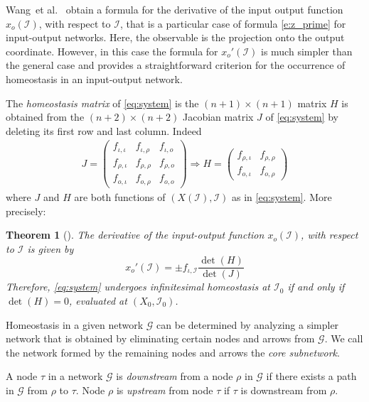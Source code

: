 \documentclass[a4paper,fleqn]{cas-dc}
\newcommand{\II}{{\mathcal I}}
\newtheorem{theorem}{Theorem}[section]
\newcommand{\etal}{\textrm{et al.}}
\begin{document}
Wang~\etal~\cite{wang2021} obtain a formula for the derivative of the input output function $x_o(\II)$, with respect to $\II$, that is a particular case of formula \eqref{e:z_prime} for input-output networks.
Here, the observable is the projection onto the output coordinate.
However, in this case the formula for 
$x_o'(\II)$ is much simpler than the general case and provides a straightforward criterion for the occurrence of homeostasis in an input-output network.

The \emph{homeostasis matrix} of \eqref{eq:system} is the $(n+1)\times (n+1)$ matrix $H$ is obtained from the $(n+2)\times(n+2)$ Jacobian matrix $J$ of \eqref{eq:system} by deleting its first row and last column. 
Indeed
\begin{align*}
J = \begin{pmatrix}
f_{\iota,\iota} & f_{\iota,\rho} & f_{\iota, o} \\
f_{\rho,\iota} & f_{\rho,\rho} & f_{\rho,o} \\
f_{o,\iota} & f_{o,\rho} & f_{o,o}
\end{pmatrix}
\Longrightarrow
H = \begin{pmatrix}
f_{\rho,\iota} & f_{\rho,\rho} \\
f_{o,\iota} & f_{o,\rho}
\end{pmatrix}
\end{align*}
where $J$ and $H$ are both functions of $(X(\II),\II)$ as in \eqref{eq:system}.  More precisely: 

\begin{theorem}[{\cite[lemma 1.5]{wang2021}}] \label{lem:irreducible}
The derivative of the input-output function $x_o(\II)$, with respect to $\II$ is given by
\begin{equation}
 x_o'(\II) = \pm f_{\iota,\II} \frac{\det(H)}{\det(J)} 
\end{equation}
Therefore, \eqref{eq:system} undergoes infinitesimal homeostasis at $\II_0$ if and only if $\det(H) = 0$, evaluated at $(X_0,\II_0)$. 
\end{theorem}

Homeostasis in a given network $\mathcal{G}$ can be determined by analyzing a simpler network that is obtained by eliminating certain nodes and arrows from $\mathcal{G}$.  We call the network formed by the remaining nodes and arrows the {\em core subnetwork}.

\begin{definition} \label{D:updown} \normalfont
A node $\tau$ in a network $\mathcal{G}$ is \emph{downstream} from a node $\rho$ in $\mathcal{G}$ if there exists a path in $\mathcal{G}$ from $\rho$ to $\tau$.  Node $\rho$ is \emph{upstream} from node $\tau$ if $\tau$ is downstream from $\rho$. 
\end{definition}
\end{document}
